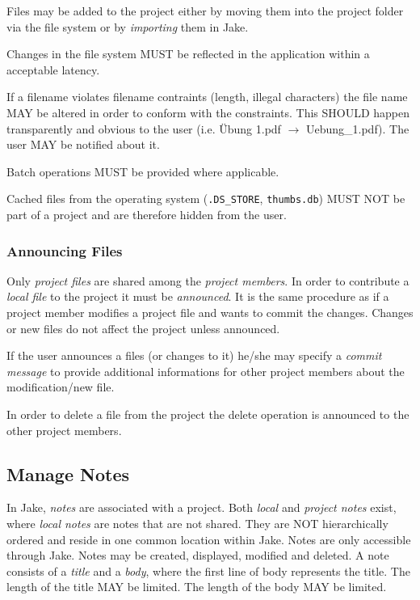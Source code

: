 Files may be added to the project either by moving them into the project folder via the file system or by \emph{importing} them in Jake.

Changes in the file system MUST be reflected in the application within a acceptable latency.

If a filename violates filename contraints (length, illegal characters) the file name MAY be altered in order to conform with the constraints. This SHOULD happen transparently and obvious to the user (i.e. Übung 1.pdf $\rightarrow$ Uebung\_1.pdf). The user MAY be notified about it.

Batch operations MUST be provided where applicable.

Cached files from the operating system (\texttt{.DS\_STORE}, \texttt{thumbs.db}) MUST NOT be part of a project and are therefore hidden from the user.

\subsubsection{Announcing Files}
Only \emph{project files} are shared among the \emph{project members}. In order to contribute a \emph{local file} to the project it must be \emph{announced}. It is the same procedure as if a project member modifies a project file and wants to commit the changes. Changes or new files do not affect the project unless announced.

If the user announces a files (or changes to it) he/she may specify a \emph{commit message} to provide additional informations for other project members about the modification/new file.

In order to delete a file from the project the delete operation is announced to the other project members.

\subsection{Manage Notes}
In Jake, \emph{notes} are associated with a project. Both \emph{local} and \emph{project notes} exist, where \emph{local notes} are notes that are not shared. They are NOT hierarchically ordered and reside in one common location within Jake. Notes are only accessible through Jake. Notes may be created, displayed, modified and deleted. A note consists of a \emph{title} and a \emph{body}, where the first line of body represents the title. The length of the title MAY be limited. The length of the body MAY be limited.

